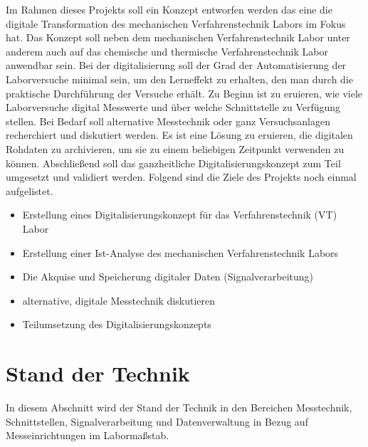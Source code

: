 \documentclass[
fontsize=12pt, 
paper=a4, 
BCOR=10mm, 
twoside=false,
 DIV=10, 
 headsepline, 
 footsepline
 ]{scrartcl}
\begin{document}
Im Rahmen dieses Projekts soll ein Konzept entworfen werden das eine die digitale Transformation des mechanischen Verfahrenstechnik Labors im Fokus hat. Das Konzept soll neben dem mechanischen Verfahrenstechnik Labor unter anderem auch auf das chemische und thermische Verfahrenstechnik Labor anwendbar sein. Bei der digitalisierung soll der Grad der Automatisierung der Laborversuche minimal sein, um den Lerneffekt zu erhalten, den man durch die praktische Durchführung der Versuche erhält. Zu Beginn ist zu eruieren, wie viele Laborversuche digital Messwerte und über welche Schnittstelle zu Verfügung stellen. Bei Bedarf soll alternative Messtechnik oder ganz Versuchsanlagen recherchiert und diskutiert werden. Es ist eine Lösung zu eruieren, die digitalen Rohdaten zu archivieren, um sie zu einem beliebigen Zeitpunkt verwenden zu können. Abschließend soll das ganzheitliche Digitalisierungskonzept zum Teil umgesetzt und validiert werden. Folgend sind die Ziele des Projekts noch einmal aufgelistet.

\begin{itemize}
\item Erstellung eines Digitalisierungskonzept für das Verfahrenstechnik (VT) Labor
\item Erstellung einer Ist-Analyse des mechanischen Verfahrenstechnik Labors
\item Die Akquise und Speicherung digitaler Daten (Signalverarbeitung)
\item alternative, digitale Messtechnik diskutieren
\item Teilumsetzung des Digitalisierungskonzepts
\end{itemize}



%
\section{Stand der Technik}

In diesem Abschnitt wird der Stand der Technik in den Bereichen Messtechnik, Schnittstellen, Signalverarbeitung und Datenverwaltung in Bezug auf Messeinrichtungen im Labormaßstab. 
\end{document}
